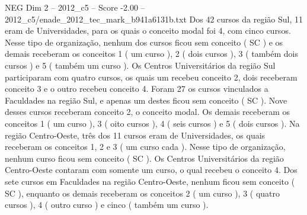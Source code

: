 \begin{textsample}{NEG Dim 2 – 2012\_c5 – Score -2.00 – 2012\_c5/enade\_2012\_tec\_mark\_b941a6131b.txt}
Dos 42 cursos da região Sul, 11 eram de Universidades, para os quais o conceito modal foi 4, com cinco cursos.
Nesse tipo de organização, nenhum dos cursos ficou sem conceito ( SC ) e os demais receberam os conceitos 1 ( um curso ), 2 ( dois cursos ), 3 ( também dois cursos ) e 5 ( também um curso ).
Os Centros Universitários da região Sul participaram com quatro cursos, os quais um recebeu conceito 2, dois receberam conceito 3 e o outro recebeu conceito 4.
Foram 27 os cursos vinculados a Faculdades na região Sul, e apenas um destes ficou sem conceito ( SC ).
Nove desses cursos receberam conceito 2, o conceito modal.
Os demais receberam os conceitos 1 ( um curso ), 3 ( oito cursos ), 4 ( seis cursos ) e 5 ( dois cursos ).
Na região Centro-Oeste, três dos 11 cursos eram de Universidades, os quais receberam os conceitos 1, 2 e 3 ( um curso cada ).
Nesse tipo de organização, nenhum curso ficou sem conceito ( SC ).
Os Centros Universitários da região Centro-Oeste contaram com somente um curso, o qual recebeu o conceito 4.
Dos sete cursos em Faculdades na região Centro-Oeste, nenhum ficou sem conceito ( SC ), enquanto os demais receberam os conceitos 2 ( um curso ), 3 ( quatro cursos ), 4 ( outro curso ) e cinco ( também um curso ).

\end{textsample}
